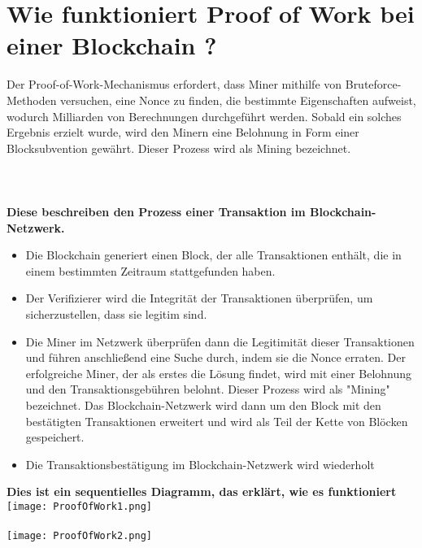 \documentclass[ngerman]{scrreprt}
\begin{document}
\section{Wie funktioniert Proof of Work bei einer Blockchain ?}
Der Proof-of-Work-Mechanismus erfordert, dass Miner mithilfe von Bruteforce-Methoden versuchen, eine Nonce zu finden, die bestimmte Eigenschaften aufweist, wodurch Milliarden von Berechnungen durchgeführt werden. Sobald ein solches Ergebnis erzielt wurde, wird den Minern eine Belohnung in Form einer Blocksubvention gewährt. Dieser Prozess wird als Mining bezeichnet.\\ \\ \\ \\
\textbf{Diese beschreiben den Prozess einer Transaktion im Blockchain-Netzwerk. \\ }
\begin{itemize}
	\item{Die Blockchain generiert einen Block, der alle Transaktionen enthält, die in einem bestimmten Zeitraum stattgefunden haben.}
	\item{Der Verifizierer wird die Integrität der Transaktionen überprüfen, um sicherzustellen, dass sie legitim sind.}
	\item{Die Miner im Netzwerk überprüfen dann die Legitimität dieser Transaktionen und führen anschließend eine Suche durch, indem sie die Nonce erraten. Der erfolgreiche Miner, der als erstes die Lösung findet, wird mit einer Belohnung und den Transaktionsgebühren belohnt. Dieser Prozess wird als "Mining" bezeichnet. Das Blockchain-Netzwerk wird dann um den Block mit den bestätigten Transaktionen erweitert und wird als Teil der Kette von Blöcken gespeichert.}
	\item{Die Transaktionsbestätigung im Blockchain-Netzwerk wird wiederholt \\}
	
\end{itemize}
\textbf{Dies ist ein sequentielles Diagramm, das erklärt, wie es funktioniert \\}
\texttt{[image: ProofOfWork1.png]} \\ \\
\texttt{[image: ProofOfWork2.png]}
\end{document}
